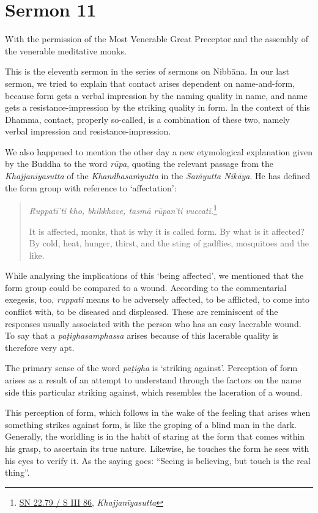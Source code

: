 \chapter{Sermon 11}

\NibbanaOpeningQuote

With the permission of the Most Venerable Great Preceptor and the assembly of the venerable meditative monks.

This is the eleventh sermon in the series of sermons on Nibbāna. In our last sermon, we tried to explain that contact arises dependent on name-and-form, because form gets a verbal impression by the naming quality in name, and name gets a resistance-impression by the striking quality in form. In the context of this Dhamma, contact, properly so-called, is a combination of these two, namely verbal impression and resistance-impression.

We also happened to mention the other day a new etymological explanation given by the Buddha to the word \emph{rūpa}, quoting the relevant passage from the \emph{Khajjanīyasutta} of the \emph{Khandhasaṁyutta} in the \emph{Saṁyutta Nikāya}. He has defined the form group with reference to `affectation':

\begin{quote}
\emph{Ruppatī'ti kho, bhikkhave, tasmā rūpan'ti vuccati.}\footnote{\href{https://suttacentral.net/sn22.79/pli/ms}{SN 22.79 / S III 86}, \emph{Khajjanīyasutta}}

It is affected, monks, that is why it is called form. By what is it affected? By cold, heat, hunger, thirst, and the sting of gadflies, mosquitoes and the like.
\end{quote}

While analysing the implications of this `being affected', we mentioned that the form group could be compared to a wound. According to the commentarial exegesis, too, \emph{ruppati} means to be adversely affected, to be afflicted, to come into conflict with, to be diseased and displeased. These are reminiscent of the responses usually associated with the person who has an easy lacerable wound. To say that a \emph{paṭighasamphassa} arises because of this lacerable quality is therefore very apt.

The primary sense of the word \emph{paṭigha} is `striking against'. Perception of form arises as a result of an attempt to understand through the factors on the name side this particular striking against, which resembles the laceration of a wound.

This perception of form, which follows in the wake of the feeling that arises when something strikes against form, is like the groping of a blind man in the dark. Generally, the worldling is in the habit of staring at the form that comes within his grasp, to ascertain its true nature. Likewise, he touches the form he sees with his eyes to verify it. As the saying goes: ``Seeing is believing, but touch is the real thing''.

